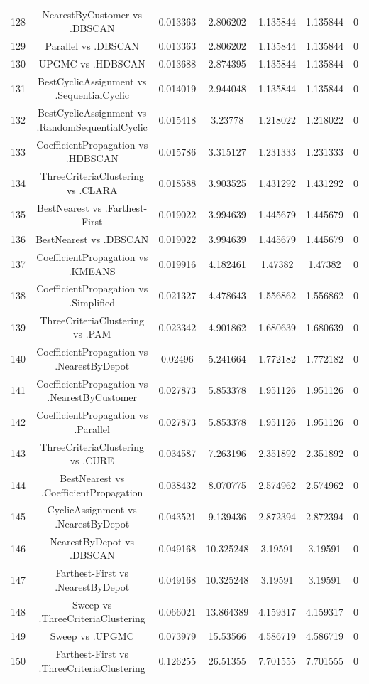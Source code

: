 \documentclass[a4paper,10pt]{article}
\begin{document}
\begin{landscape}
\begin{table}[!htp]
\begin{tabular}{ccccccc}
128&NearestByCustomer vs .DBSCAN&0.013363&2.806202&1.135844&1.135844&0\\
129&Parallel vs .DBSCAN&0.013363&2.806202&1.135844&1.135844&0\\
130&UPGMC vs .HDBSCAN&0.013688&2.874395&1.135844&1.135844&0\\
131&BestCyclicAssignment vs .SequentialCyclic&0.014019&2.944048&1.135844&1.135844&0\\
132&BestCyclicAssignment vs .RandomSequentialCyclic&0.015418&3.23778&1.218022&1.218022&0\\
133&CoefficientPropagation vs .HDBSCAN&0.015786&3.315127&1.231333&1.231333&0\\
134&ThreeCriteriaClustering vs .CLARA&0.018588&3.903525&1.431292&1.431292&0\\
135&BestNearest vs .Farthest-First&0.019022&3.994639&1.445679&1.445679&0\\
136&BestNearest vs .DBSCAN&0.019022&3.994639&1.445679&1.445679&0\\
137&CoefficientPropagation vs .KMEANS&0.019916&4.182461&1.47382&1.47382&0\\
138&CoefficientPropagation vs .Simplified&0.021327&4.478643&1.556862&1.556862&0\\
139&ThreeCriteriaClustering vs .PAM&0.023342&4.901862&1.680639&1.680639&0\\
140&CoefficientPropagation vs .NearestByDepot&0.02496&5.241664&1.772182&1.772182&0\\
141&CoefficientPropagation vs .NearestByCustomer&0.027873&5.853378&1.951126&1.951126&0\\
142&CoefficientPropagation vs .Parallel&0.027873&5.853378&1.951126&1.951126&0\\
143&ThreeCriteriaClustering vs .CURE&0.034587&7.263196&2.351892&2.351892&0\\
144&BestNearest vs .CoefficientPropagation&0.038432&8.070775&2.574962&2.574962&0\\
145&CyclicAssignment vs .NearestByDepot&0.043521&9.139436&2.872394&2.872394&0\\
146&NearestByDepot vs .DBSCAN&0.049168&10.325248&3.19591&3.19591&0\\
147&Farthest-First vs .NearestByDepot&0.049168&10.325248&3.19591&3.19591&0\\
148&Sweep vs .ThreeCriteriaClustering&0.066021&13.864389&4.159317&4.159317&0\\
149&Sweep vs .UPGMC&0.073979&15.53566&4.586719&4.586719&0\\
150&Farthest-First vs .ThreeCriteriaClustering&0.126255&26.51355&7.701555&7.701555&0\\

\end{tabular}
\end{table}
\end{landscape}
\end{document}

